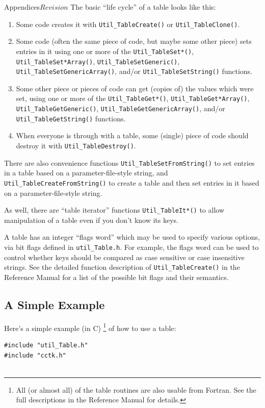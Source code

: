 \begin{cactuspart}{Appendices}{}{$Revision$}
The basic ``life cycle'' of a table looks like this:
\begin{enumerate}
\item	Some code creates it with \verb|Util_TableCreate()|
	or \verb|Util_TableClone()|.
\item	Some code (often the same piece of code, but maybe some
	other piece) sets entries in it using one or more of
	the \verb|Util_TableSet*()|, \verb|Util_TableSet*Array()|,
	\verb|Util_TableSetGeneric()|, \verb|Util_TableSetGenericArray()|,
	and/or \verb|Util_TableSetString()| functions.
\item	Some other piece or pieces of code can get (copies of)
	the values which were set, using one or more of the
	\verb|Util_TableGet*()|, \verb|Util_TableGet*Array()|,
	\verb|Util_TableGetGeneric()|, \verb|Util_TableGetGenericArray()|,
	and/or \verb|Util_TableGetString()| functions.
\item	When everyone is through with a table, some (single)
	piece of code should destroy it with \verb|Util_TableDestroy()|.
\end{enumerate}

There are also convenience functions \verb|Util_TableSetFromString()|
to set entries in a table based on a parameter-file-style string,
and \verb|Util_TableCreateFromString()| to create a table and then
set entries in it based on a parameter-file-style string.

As well, there are ``table iterator'' functions \verb|Util_TableIt*()|
to allow manipulation of a table even if you don't know its keys.

A table has an integer ``flags word'' which may be used to specify
various options, via bit flags defined in \verb|util_Table.h|.
For example, the flags word can be used to control whether keys
should be compared as case sensitive or case insensitive strings.
See the detailed function description of \verb|Util_TableCreate()|
in the Reference Manual for a list
of the possible bit flags and their semantics.


\subsection{A Simple Example}
\label{Tables_Simple_Example}

Here's a simple example (in C)%
\footnote{%
	 All (or almost all) of the table routines
	 are also usable from Fortran.  See the full
	 descriptions in the Reference Manual
	 for details.
	 }%
{} of how to use a table:
\begin{verbatim}
#include "util_Table.h"
#include "cctk.h"


\end{verbatim}
\end{cactuspart}
